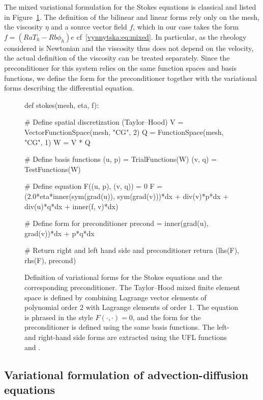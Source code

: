 The mixed variational formulation for the Stokes equations is
classical and listed in Figure~\ref{vynnytska:fig:stokes}. The
definition of the bilinear and linear forms rely only on the mesh, the
viscosity $\eta$ and a source vector field $f$, which in our case
takes the form $f = (Ra T_h - Rb \phi_h) e$
cf~\eqref{vynnytska:eq:mixed}. In particular, as the rheology
considered is Newtonian and the viscosity thus does not depend on the
velocity, the actual definition of the viscosity can be treated
separately. Since the preconditioner for this system relies on the
same function spaces and basis functions, we define the form for the
preconditioner together with the variational forms describing the
differential equation.
\begin{figure}
  \begin{python}
def stokes(mesh, eta, f):

    # Define spatial discretization (Taylor--Hood)
    V = VectorFunctionSpace(mesh, "CG", 2)
    Q = FunctionSpace(mesh, "CG", 1)
    W = V * Q

    # Define basis functions
    (u, p) = TrialFunctions(W)
    (v, q) = TestFunctions(W)

    # Define equation F((u, p), (v, q)) = 0
    F = (2.0*eta*inner(sym(grad(u)), sym(grad(v)))*dx
         + div(v)*p*dx
         + div(u)*q*dx
         + inner(f, v)*dx)

    # Define form for preconditioner
    precond = inner(grad(u), grad(v))*dx + p*q*dx

    # Return right and left hand side and preconditioner
    return (lhs(F), rhs(F), precond)
  \end{python}
  \caption{Definition of variational forms for the Stokes equations
    and the corresponding preconditioner. The Taylor--Hood mixed
    finite element space is defined by combining Lagrange vector
    elements of polynomial order 2 with Lagrange elements of order
    1. The equation is phrased in the style $F(\cdot, \cdot) = 0$, and
    the form for the preconditioner is defined using the same basis
    functions. The left- and right-hand side forms are extracted using
    the UFL functions  and .}
  \label{vynnytska:fig:stokes}
\end{figure}

\subsection{Variational formulation of advection-diffusion equations}

